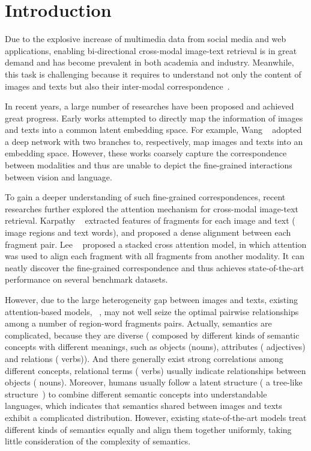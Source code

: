 \documentclass[10pt,twocolumn,letterpaper]{article}
\begin{document}
\section{Introduction}
Due to the explosive increase of multimedia data from social media and web applications, enabling bi-directional cross-modal image-text retrieval is in great demand and
has become prevalent in both academia and industry. Meanwhile, this task is challenging because it requires to understand not only the content of images and texts but also their inter-modal correspondence~\cite{Karpathy2014Deep}.

In recent years, a large number of researches have been proposed and achieved great progress. Early works attempted to directly map the information of images and texts into a common latent embedding space. For example, Wang \etal~\cite{wang2016learning} adopted a deep network with two branches to, respectively, map images and texts into an embedding space. However, these works coarsely capture the correspondence between modalities and thus are unable to depict the fine-grained interactions between vision and language. 

To gain a deeper understanding of such fine-grained correspondences, recent researches further explored the attention mechanism for cross-modal image-text retrieval. Karpathy \etal{}~\cite{karpathy2015deep} extracted features of fragments for each image and text (\ie{} image regions and text words), and proposed a dense alignment between each fragment pair. Lee \etal{}~\cite{lee2018stacked} proposed a stacked cross attention model, in which attention was used to align each fragment with all fragments from another modality. It can neatly discover the fine-grained correspondence and thus achieves state-of-the-art performance on several benchmark datasets.

However, due to the large heterogeneity gap between images and texts, existing attention-based models, \eg{}~\cite{lee2018stacked}, may not well seize the optimal pairwise relationships among a number of region-word fragments pairs. Actually, semantics are complicated, because they are diverse (\ie{} composed by different kinds of semantic concepts with different meanings, such as objects (\eg nouns), attributes (\eg{} adjectives) and relations (\eg{} verbs)). And there generally exist strong correlations among different concepts, \eg{} relational terms (\eg{} verbs) usually indicate relationships between objects (\eg{} nouns). Moreover, humans usually follow a latent structure (\eg{} a tree-like structure~\cite{tai2015improved}) to combine different semantic concepts into understandable languages, which indicates that semantics shared between images and texts exhibit a complicated distribution. However, existing state-of-the-art models treat different kinds of semantics equally and align them together uniformly, taking little consideration of the complexity of semantics.
\end{document}
